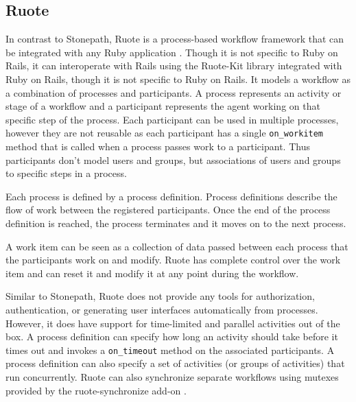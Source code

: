 \documentclass[document.tex]{subfiles}
\begin{document}
\subsection {Ruote}

In contrast to Stonepath, Ruote is a process-based workflow framework that can be integrated with any Ruby application \cite{ruote}. Though it is not specific to Ruby on Rails, it can interoperate with Rails using the Ruote-Kit library \cite{ruote-kit} integrated with Ruby on Rails, though it is not specific to Ruby on Rails. It models a workflow as a combination of processes and participants. A process represents an activity or stage of a workflow and a participant represents the agent working on that specific step of the process. Each participant can be used in multiple processes, however they are not reusable as each participant has a single \verb!on_workitem! method that is called when a process passes work to a participant. Thus participants don't model users and groups, but associations of users and groups to specific steps in a process.


Each process is defined by a process definition. Process definitions describe the flow of work between the registered participants. Once the end of the process definition is reached, the process terminates and it moves on to the next process.

A work item can be seen as a collection of data passed between each process that the participants work on and modify. Ruote has complete control over the work item and can reset it and modify it at any point during the workflow.

Similar to Stonepath, Ruote does not provide any tools for authorization, authentication, or generating user interfaces automatically from processes. However, it does have support for time-limited and parallel activities out of the box. A process definition can specify how long an activity should take before it times out and invokes a \verb!on_timeout! method on the associated participants. A process definition can also specify a set of activities (or groups of activities) that run concurrently. Ruote can also synchronize separate workflows using mutexes provided by the ruote-synchronize add-on \cite{ruote-synchronize}.
\end{document}
